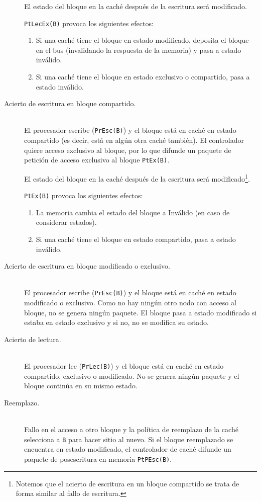 \begin{description}
    El estado del bloque en la caché después de la escritura será modificado.

    \verb|PtLecEx(B)| provoca los siguientes efectos:
    \begin{enumerate}
        \item Si una caché tiene el bloque en estado modificado, deposita el bloque en el bus (invalidando la respuesta de la memoria) y pasa a estado inválido.
        \item Si una caché tiene el bloque en estado exclusivo o compartido, pasa a estado inválido.
    \end{enumerate}

    \item [Acierto de escritura en bloque compartido.]~\\
    El procesador escribe (\verb|PrEsc(B)|) y el bloque está en caché en estado compartido (es decir, está en algún otra caché también). El controlador quiere acceso exclusivo al bloque, por lo que difunde un paquete de petición de acceso exclusivo al bloque \verb|PtEx(B)|.

    El estado del bloque en la caché después de la escritura será modificado\footnote{Notemos que el acierto de escritura en un bloque compartido se trata de forma similar al fallo de escritura.}.

    \verb|PtEx(B)| provoca los siguientes efectos:
    \begin{enumerate}
        \item La memoria cambia el estado del bloque a Inválido (en caso de considerar estados).
        \item Si una caché tiene el bloque en estado compartido, pasa a estado inválido.
    \end{enumerate}
    \item [Acierto de escritura en bloque modificado o exclusivo.]~\\
        El procesador escribe (\verb|PrEsc(B)|) y el bloque está en caché en estado modificado o exclusivo. Como no hay ningún otro nodo con acceso al bloque, no se genera ningún paquete. El bloque pasa a estado modificado si estaba en estado exclusivo y si no, no se modifica su estado.
    \item [Acierto de lectura.]~\\
        El procesador lee (\verb|PrLec(B)|) y el bloque está en caché en estado compartido, exclusivo o modificado. No se genera ningún paquete y el bloque continúa en su mismo estado.
    \item [Reemplazo.]~\\
        Fallo en el acceso a otro bloque y la política de reemplazo de la caché selecciona a \verb|B| para hacer sitio al nuevo. Si el bloque reemplazado se encuentra en estado modificado, el controlador de caché difunde un paquete de posescritura en memoria \verb|PtPEsc(B)|. 


\end{description}
